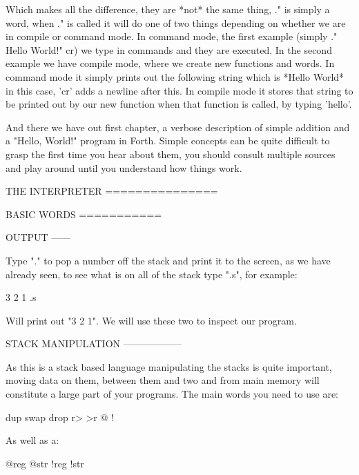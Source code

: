\begin{DoxyVerb}Which makes all the difference, they are *not* the same thing, ." is simply a
word, when ." is called it will do one of two things depending on whether we are
in compile or command mode. In command mode, the first example (simply ." Hello
World!" cr) we type in commands and they are executed. In the second example we
have compile mode, where we create new functions and words. In command mode it
simply prints out the following string which is *Hello World* in this case, 'cr'
adds a newline after this. In compile mode it stores that string to be printed
out by our new function when that function is called, by typing 'hello'. 

And there we have out first chapter, a verbose description of simple addition
and a "Hello, World!" program in Forth. Simple concepts can be quite difficult
to grasp the first time you hear about them, you should consult multiple sources
and play around until you understand how things work.

THE INTERPRETER
===============

BASIC WORDS
===========

OUTPUT
------

Type "." to pop a number off the stack and print it to the screen, as we have
already seen, to see what is on all of the stack type ".s", for example:\end{DoxyVerb}
 \begin{DoxyVerb}3 2 1 .s
\end{DoxyVerb}


\begin{DoxyVerb}Will print out "3 2 1". We will use these two to inspect our program.

STACK MANIPULATION
------------------

As this is a stack based language manipulating the stacks is quite important,
moving data on them, between them and two and from main memory will constitute
a large part of your programs. The main words you need to use are:\end{DoxyVerb}
 \begin{DoxyVerb}dup swap drop r> >r @ !
\end{DoxyVerb}


\begin{DoxyVerb}As well as a:\end{DoxyVerb}
 \begin{DoxyVerb}@reg @str !reg !str
\end{DoxyVerb}


